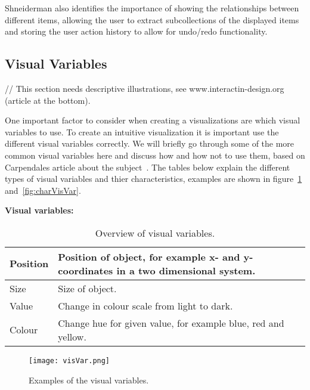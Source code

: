 Shneiderman also identifies the importance of showing the relationships between different items, allowing the user to extract subcollections of the displayed items and storing the user action history to allow for undo/redo functionality.

\subsection{Visual Variables} 
// This section needs descriptive illustrations, see www.interactin-design.org (article at the bottom).

One important factor to consider when creating a visualizations are which visual variables to use. To create an intuitive visualization it is important use the different visual variables correctly. We will briefly go through some of the more common visual variables here and discuss how and how not to use them, based on Carpendales article about the subject~\cite{carpendale}. The tables below explain the different types of visual variables and thier characteristics, examples are shown in figure~\ref{fig:visVar} and~\ref{fig:charVisVar}.

\textbf{Visual variables:}
\begin{table}[h!]
  \begin{tabular}{|l|p{10cm}|}
      \hline
      Position    & Position of object, for example x- and y-coordinates in a two dimensional system. \\ \hline
      Size        & Size of object. \\ \hline
      Value       & Change in colour scale from light to dark. \\ \hline
      Colour      & Change hue for given value, for example blue, red and yellow. \\ \hline
  \end{tabular}
  \caption{Overview of visual variables.}
\end{table}

\begin{figure}[h!]
	\centering
		\texttt{[image: visVar.png]}
		\caption{\footnotesize Examples of the visual variables.}
		\label{fig:visVar}
\end{figure}

